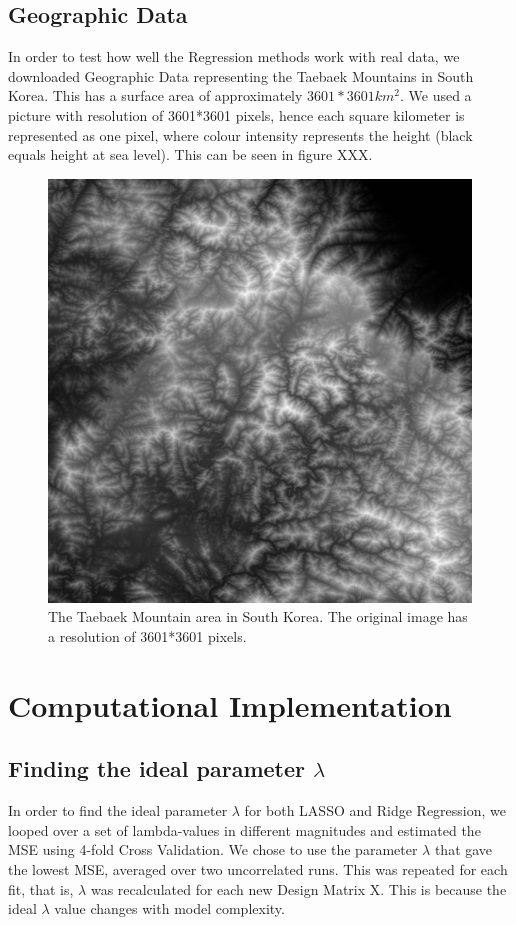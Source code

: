 \documentclass[11pt,a4paper,titlepage]{article}
\begin{document}
\subsection{Geographic Data}
In order to test how well the Regression methods work with real data, we downloaded Geographic Data representing the Taebaek Mountains in South Korea. This has a surface area of approximately $3601*3601 km^2$. We used a picture with resolution of 3601*3601 pixels, hence each square kilometer is represented as one pixel, where colour intensity represents the height (black equals height at sea level). This can be seen in figure XXX.
\begin{figure}[H]
\centering
\includegraphics[trim=1cm 0.2cm 1.5cm 1.2cm, clip=true,scale = 0.05]{../figures/presentable_data/korea.png}
\caption[Taebbaek Mountain]{The Taebaek Mountain area in South Korea. The original image has a resolution of 3601*3601 pixels.}\label{Korea}
\end{figure}
\section{Computational Implementation}
\subsection{Finding the ideal parameter $\lambda$}
In order to find the ideal parameter $\lambda$ for both LASSO and Ridge Regression, we looped over a set of lambda-values in different magnitudes and estimated the MSE using 4-fold Cross Validation. We chose to use the parameter $\lambda$ that gave the lowest MSE, averaged over two uncorrelated runs. This was repeated for each fit, that is,  $\lambda$ was recalculated for each new Design Matrix X. This is because the ideal $\lambda$ value changes with model complexity.
\end{document}
